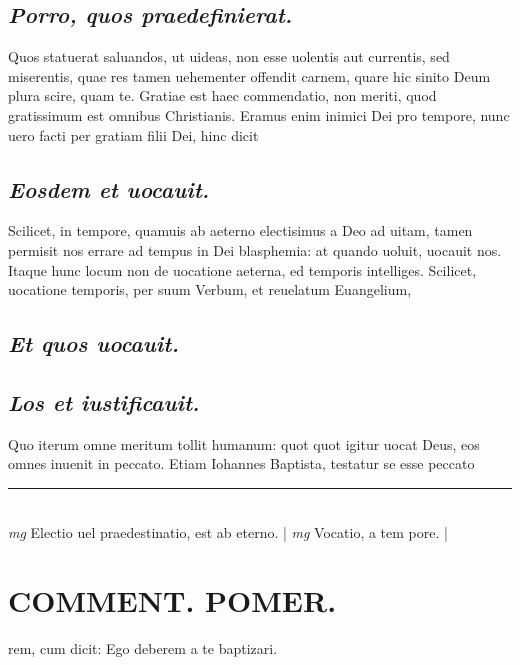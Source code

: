\documentclass{article}
\begin{document}
\begin{pages}
\subsection*{\textit{Porro, quos praedefinierat. }}\pstart Quos statuerat saluandos, ut uideas, non esse uolentis aut currentis, sed miserentis, quae res tamen uehementer offendit carnem, quare hic sinito Deum plura scire, quam te. Gratiae est haec commendatio, non meriti, quod gratissimum est omnibus Christianis. Eramus enim inimici Dei pro tempore, nunc uero facti per gratiam filii Dei, hinc dicit  \pend
{}
{}
\subsection*{\textit{Eosdem et uocauit. }}\pstart Scilicet, in tempore, quamuis ab aeterno electisimus a Deo ad uitam, tamen permisit nos errare ad tempus in Dei blasphemia: at quando uoluit, uocauit nos. Itaque hunc locum non de uocatione aeterna, ed temporis intelliges.  \pend\pstart Scilicet, uocatione temporis, per suum Verbum, et reuelatum Euangelium,  \pend
{}
{}
\subsection*{\textit{Et quos uocauit. }}
{}
\subsection*{\textit{Los et iustificauit. }}\pstart Quo iterum omne meritum tollit humanum: quot quot igitur uocat Deus, eos omnes inuenit in peccato. Etiam Iohannes Baptista, testatur se esse peccato\pend
\vspace{0.5cm}\noindent
\vspace{0.2cm}\rule{1cm}{0.2pt}\\ 
\hspace{0.2cm}\textit{mg}
\footnotesize Electio uel praedestinatio, est ab eterno. 
\normalsize| 
\hspace{0.2cm}\textit{mg}
\footnotesize Vocatio, a tem pore. 
\normalsize| 
\section*{COMMENT. POMER.  }\pstart rem, cum dicit: Ego deberem a te baptizari.   \pend
{}
{}

\end{pages}
\end{document}

